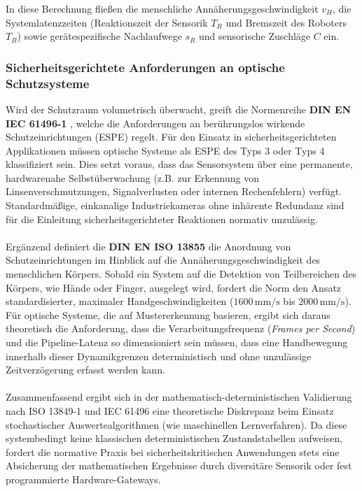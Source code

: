 In diese Berechnung fließen die menschliche Annäherungsgeschwindigkeit $v_H$, die Systemlatenzzeiten (Reaktionszeit der Sensorik $T_R$ und Bremszeit des Roboters $T_B$) sowie gerätespezifische Nachlaufwege $s_R$ und sensorische Zuschläge $C$ ein.

\subsubsection{Sicherheitsgerichtete Anforderungen an optische Schutzsysteme}

Wird der Schutzraum volumetrisch überwacht, greift die Normenreihe \textbf{DIN EN IEC 61496-1} \cite{din_iec_61496_1_2021}, welche die Anforderungen an berührungslos wirkende Schutzeinrichtungen (ESPE) regelt. Für den Einsatz in sicherheitsgerichteten Applikationen müssen optische Systeme als ESPE des Typs 3 oder Typs 4 klassifiziert sein. Dies setzt voraus, dass das Sensorsystem über eine permanente, hardwarenahe Selbstüberwachung (z.B. zur Erkennung von Linsenverschmutzungen, Signalverlusten oder internen Rechenfehlern) verfügt. Standardmäßige, einkanalige Industriekameras ohne inhärente Redundanz sind für die Einleitung sicherheitsgerichteter Reaktionen normativ unzulässig.
\\
\\Ergänzend definiert die \textbf{DIN EN ISO 13855} \cite{din13855_2025} die Anordnung von Schutzeinrichtungen im Hinblick auf die Annäherungsgeschwindigkeit des menschlichen Körpers. Sobald ein System auf die Detektion von Teilbereichen des Körpers, wie Hände oder Finger, ausgelegt wird, fordert die Norm den Ansatz standardisierter, maximaler Handgeschwindigkeiten ($1600\,\text{mm/s}$ bis $2000\,\text{mm/s}$). Für optische Systeme, die auf Mustererkennung basieren, ergibt sich daraus theoretisch die Anforderung, dass die Verarbeitungsfrequenz (\textit{Frames per Second}) und die Pipeline-Latenz so dimensioniert sein müssen, dass eine Handbewegung innerhalb dieser Dynamikgrenzen deterministisch und ohne unzulässige Zeitverzögerung erfasst werden kann.
\\
\\Zusammenfassend ergibt sich in der mathematisch-deterministischen Validierung nach ISO 13849-1 \cite{din13849_1_2023} und IEC 61496 \cite{din_iec_61496_1_2021} eine theoretische Diskrepanz beim Einsatz stochastischer Auswertealgorithmen (wie maschinellen Lernverfahren). Da diese systembedingt keine klassischen deterministischen Zustandstabellen aufweisen, fordert die normative Praxis bei sicherheitskritischen Anwendungen stets eine Absicherung der mathematischen Ergebnisse durch diversitäre Sensorik oder fest programmierte Hardware-Gateways.

